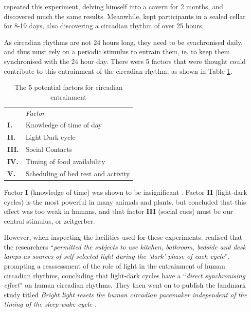 \citet{siffreTime1964} repeated this experiment, delving himself into a cavern for 2 months, and discovered much the same results. Meanwhile, \citet{vonaschoffSpontanperiodikMenschenBei1962} kept participants in a sealed cellar for 8-19 days, also discovering a circadian rhythm of over 25 hours.

As circadian rhythms are not 24 hours long, they need to be synchronised daily, and thus must rely on a periodic stimulus to entrain them, ie. to keep them synchronised with the 24 hour day. There were 5 factors that were thought could contribute to this entrainment of the circadian rhythm, as shown in Table \ref{Tab:Factors}.

\begin{table}
\caption{The 5 potential factors for circadian entrainment \citep{czeislerEntrainmentHumanOrcadian1981}}
\label{Tab:Factors}
\begin{tabular}{l l}
\hline
 & \textit{Factor} \\
\textbf{I.}& Knowledge of time of day \\
\textbf{II.}& Light Dark cycle \\
\textbf{III.}& Social Contacts \\
\textbf{IV.}& Timing of food availability \\
\textbf{V.}& Scheduling of bed rest and activity \\
\hline
\end{tabular}
\end{table}


Factor \textbf{I} (knowledge of time) was shown to be insignificant \citep{millsCircadianRhythmsThree1964}. Factor \textbf{II} (light-dark cycles) is the most powerful in many animals and plants, but \citet{aschoffHumanCircadianRhythms1971} concluded that this effect was too weak in humans, and that factor \textbf{III} (social cues) must be our central stimulus, or zeitgerber. 

However, when inspecting the facilities used for these experiments, \citet{czeislerEntrainmentHumanOrcadian1981} realised that the researchers ``\textit{permitted the subjects to use kitchen, bathroom, bedside and desk lamps as sources of self-selected light during the `dark' phase of each cycle}'', prompting a reassessment of the role of light in the entrainment of human circadian rhythms, concluding that light-dark cycles have a ``\textit{direct synchronising effect}'' on human circadian rhythms. They then went on to publish the landmark study titled \textit{Bright light resets the human circadian pacemaker independent of the timing of the sleep-wake cycle} \citep{czeislerBrightLightResets1986}.

